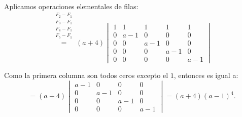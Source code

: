 \documentclass[a4paper,12pt]{article}
\begin{document}
\begin{ejercicio}[title=Ejercicio 40]
Aplicamos operaciones elementales de filas:
\[
\overset{\substack{F_2-F_1\\F_3-F_1\\F_4-F_1\\F_5-F_1\\{}}}{=}
(a+4)
\begin{vmatrix}
1 & 1 & 1 & 1 & 1\\
0 & a-1 & 0 & 0 & 0\\
0 & 0 & a-1 & 0 & 0\\
0 & 0 & 0 & a-1 & 0\\
0 & 0 & 0 & 0 & a-1
\end{vmatrix}
\]

Como la primera columna son todos ceros excepto el $1$, entonces es igual a:
\[
= (a+4)
\begin{vmatrix}
a-1 & 0 & 0 & 0\\
0 & a-1 & 0 & 0\\
0 & 0 & a-1 & 0\\
0 & 0 & 0 & a-1
\end{vmatrix}
= \boxed{(a+4)(a-1)^4}.
\]
\end{ejercicio}
\end{document}
